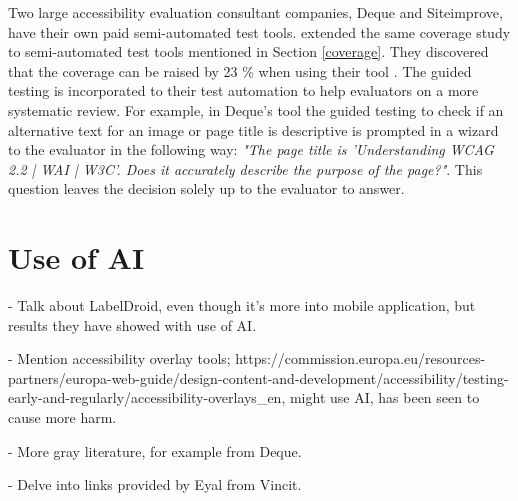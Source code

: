 Two large accessibility evaluation consultant companies, Deque and Siteimprove, have their own paid semi-automated test tools. \citep{dequecoverage_semi} extended the same coverage study to semi-automated test tools mentioned in Section \ref{coverage}. They discovered that the coverage can be raised by 23 \% when using their tool \citep{dequecoverage_semi}. The guided testing is incorporated to their test automation to help evaluators on a more systematic review. For example, in Deque's tool the guided testing to check if an alternative text for an image or page title is descriptive is prompted in a wizard to the evaluator in the following way: \textit{"The page title is 'Understanding WCAG 2.2 | WAI | W3C'. Does it accurately describe the purpose of the page?"}. This question leaves the decision solely up to the evaluator to answer.


\section{Use of AI}

- Talk about LabelDroid, even though it's more into mobile application, but results they have showed with use of AI.

- Mention accessibility overlay tools; https://commission.europa.eu/resources-partners/europa-web-guide/design-content-and-development/accessibility/testing-early-and-regularly/accessibility-overlays_en, might use AI, has been seen to cause more harm.

- More gray literature, for example from Deque.

- Delve into links provided by Eyal from Vincit.
